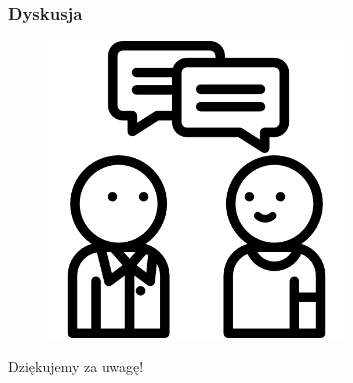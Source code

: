 \documentclass[aspectratio=169]{beamer}
\begin{document}
\begin{frame}
	\frametitle{Dyskusja}
	\begin{figure}
		\centering
		\includegraphics[width=0.7\textwidth]{questions.png}
	\end{figure}
\end{frame}


\begin{frame}
	  \begin{center}
	\Huge Dziękujemy za uwagę!
	\end{center}
\end{frame}
\end{document}
